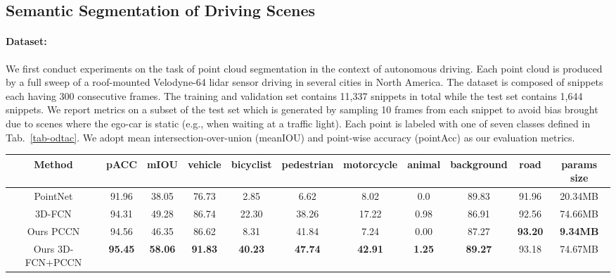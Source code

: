 \documentclass[10pt,twocolumn,letterpaper]{article}
\begin{document}
\subsection{Semantic Segmentation of Driving Scenes} 
\label{sec:odtac}
\paragraph{Dataset:} We first conduct experiments on the task of point cloud segmentation in the context of autonomous driving. Each point cloud is produced by a full sweep of a roof-mounted Velodyne-64 lidar sensor driving in several cities in North America. 
The dataset is composed of snippets each having 300 consecutive frames. The training and validation set contains 11,337 snippets in total while the test set contains 1,644 snippets.  We  report metrics on a subset of the test set which is generated by sampling 10 frames from each snippet to avoid bias brought due to scenes where the ego-car is  static (e.g., when waiting at a traffic light). 
Each point is labeled with one of seven classes defined in Tab.~\ref{tab-odtac}.
We adopt mean intersection-over-union (meanIOU) and point-wise accuracy  (pointAcc) as our evaluation metrics. 
\begin{table*}[]
	\centering
	\footnotesize
	\setlength\tabcolsep{4pt} \begin{tabular}{c|cc|ccccccc|c}
        Method	      							&  \cellcolor{blue!25}  \textbf{pACC}	&   \cellcolor{blue!25} \textbf{mIOU}   & vehicle         & bicyclist        & pedestrian       & motorcycle       & animal          & background       & road       & params size      \\ \hline
		PointNet \cite{pointnet}              	&  \cellcolor{blue!25}  91.96        	&  \cellcolor{blue!25}  38.05          & 76.73         & 2.85          & 6.62        & 8.02        & 0.0          & 89.83    & 91.96   & 20.34MB \\ 
		3D-FCN \cite{resnet}            	 	&   \cellcolor{blue!25} 94.31        	&  \cellcolor{blue!25}  49.28          & 86.74          & 22.30         	& 38.26          	& 17.22          & 0.98 	& 86.91          	& 92.56 &   74.66MB   \\ \hline
		Ours PCCN   							&   \cellcolor{blue!25} 94.56 &   \cellcolor{blue!25} 46.35 & 86.62 & 8.31 & 41.84 & 7.24 & 0.00 & 87.27 & \textbf{93.20} & \textbf{9.34MB} \\
		Ours 3D-FCN+PCCN 						&   \cellcolor{blue!25} \textbf{95.45}  &  \cellcolor{blue!25} 	\textbf{58.06}  &	\textbf{91.83}  & \textbf{40.23}  &	\textbf{47.74}  &	\textbf{42.91}  &	\textbf{1.25}  &	\textbf{89.27}  &	93.18  &  74.67MB \\ 
	\end{tabular}
	\vspace{-3mm}
	\caption{Semenatic Segmentation Results on Driving Scenes Dataset}
	\label{tab-odtac}
	\end{table*}
\end{document}
